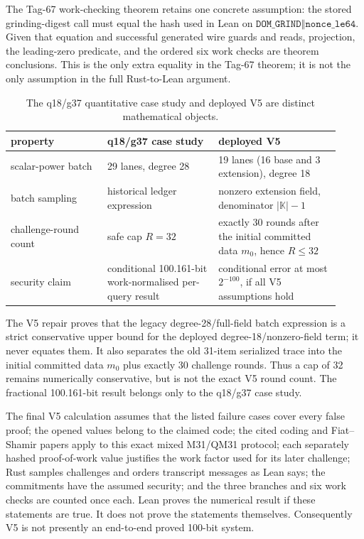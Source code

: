 The Tag-67 work-checking theorem retains one concrete assumption: the stored
grinding-digest call must equal the hash used in Lean on
\(\texttt{DOM\_GRIND}\mathbin\Vert\texttt{nonce\_le64}\).  Given that
equation and successful generated wire guards and reads, projection, the
leading-zero predicate, and the ordered six work checks are theorem
conclusions.  This is the only extra equality in the Tag-67 theorem; it is not
the only assumption in the full Rust-to-Lean argument.

\begin{table}[t]
\centering
\small
\caption{The q18/g37 quantitative case study and deployed V5 are distinct
mathematical objects.}
\label{tab:q18-v5-math-status}
\begin{tabular}{@{}p{0.27\linewidth}p{0.31\linewidth}p{0.34\linewidth}@{}}
\toprule
property & q18/g37 case study & deployed V5 \\
\midrule
scalar-power batch & 29 lanes, degree 28 & 19 lanes (16 base and 3 extension), degree 18 \\
batch sampling & historical ledger expression & nonzero extension field, denominator \(\lvert\mathbb K\rvert-1\) \\
challenge-round count & safe cap \(R=32\) & exactly 30 rounds after the initial committed data \(m_0\), hence \(R\le32\) \\
security claim & conditional 100.161-bit work-normalised per-query result & conditional error at most \(2^{-100}\), if all V5 assumptions hold \\
\bottomrule
\end{tabular}
\end{table}

The V5 repair proves that the legacy degree-28/full-field batch expression is
a strict conservative upper bound for the deployed degree-18/nonzero-field
term; it never equates them.  It also separates the old 31-item serialized
trace into the initial committed data \(m_0\) plus exactly 30 challenge
rounds.  Thus a cap of 32 remains numerically conservative, but is not the
exact V5 round count.  The fractional 100.161-bit result belongs only to the
q18/g37 case study.

The final V5 calculation assumes that the listed failure cases cover every
false proof; the opened values belong to the claimed code; the cited coding
and Fiat--Shamir papers apply to this exact mixed M31/QM31 protocol; each
separately hashed proof-of-work value justifies the work factor used for its
later challenge; Rust samples challenges and orders transcript messages as
Lean says; the commitments have the assumed security; and the three branches
and six work checks are counted once each.  Lean proves the numerical result
if these statements are true.  It does not prove the statements themselves.
Consequently V5 is not presently an end-to-end proved 100-bit system.

